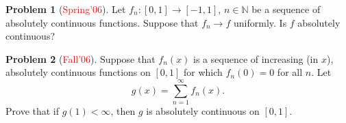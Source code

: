 \documentclass[12pt]{amsart}
\def\field#1{\mathbb{#1}}
\theoremstyle{definition}
\newtheorem{problem}{Problem}
\theoremstyle{remark}
\begin{document}
\begin{problem}[\textcolor{red}{Spring'06}]
  Let $f_n\colon [0,1] \to [-1,1]$, $n \in \field{N}$ be a sequence of
  absolutely continuous functions.  Suppose that $f_n \to f$
  uniformly.  Is $f$ absolutely continuous?
\end{problem}
\begin{problem}[\textcolor{red}{Fall'06}]
  Suppose that $f_n(x)$ is a sequence of increasing (in $x$),
  absolutely continuous functions on $[0,1]$ for which $f_n(0)=0$ for
  all $n$. Let
  \begin{equation*}
    g(x) = \sum_{n=1}^\infty f_n(x).
  \end{equation*}
  Prove that if $g(1)<\infty$, then $g$ is absolutely continuous on
  $[0,1]$.
\end{problem}
\end{document}
